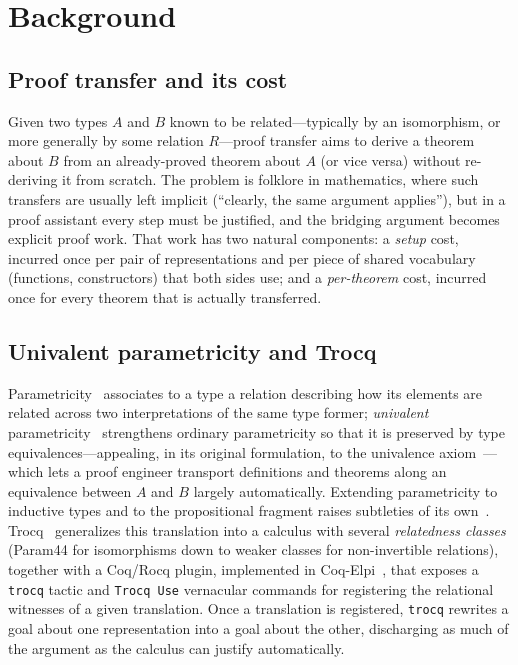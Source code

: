 \documentclass[runningheads]{llncs}
\begin{document}
\section{Background}
\label{sec:background}

\subsection{Proof transfer and its cost}
Given two types $A$ and $B$ known to be related---typically by an
isomorphism, or more generally by some relation $R$---proof transfer aims
to derive a theorem about $B$ from an already-proved theorem about $A$
(or vice versa) without re-deriving it from scratch. The problem is folklore
in mathematics, where such transfers are usually left implicit
(``clearly, the same argument applies''), but in a proof assistant every
step must be justified, and the bridging argument becomes explicit proof
work. That work has two natural components: a \emph{setup} cost, incurred
once per pair of representations and per piece of shared vocabulary
(functions, constructors) that both sides use; and a \emph{per-theorem}
cost, incurred once for every theorem that is actually transferred.

\subsection{Univalent parametricity and Trocq}
Parametricity~\cite{reynolds1983types} associates to a type a relation
describing how its elements are related across two interpretations of the
same type former; \emph{univalent} parametricity~\cite{tabareau2018equivalences,tabareau2021marriage}
strengthens ordinary parametricity so that it is preserved by type
equivalences---appealing, in its original formulation, to the univalence
axiom~\cite{hottbook}---which lets a proof engineer transport definitions and
theorems along an equivalence between $A$ and $B$ largely automatically.
Extending parametricity to inductive types and to the propositional fragment
raises subtleties of its own~\cite{anand2017revisiting}.
Trocq~\cite{cohen2024trocq,cohen2025trocq} generalizes this translation
into a calculus with several \emph{relatedness classes} (Param44 for
isomorphisms down to weaker classes for non-invertible relations), together
with a Coq/Rocq plugin, implemented in Coq-Elpi~\cite{tassi2019elpi}, that
exposes a \texttt{trocq} tactic and \texttt{Trocq Use} vernacular commands
for registering the relational witnesses of a given translation. Once a
translation is registered, \texttt{trocq} rewrites a goal about one
representation into a goal about the other, discharging as much of the
argument as the calculus can justify automatically.
\end{document}
